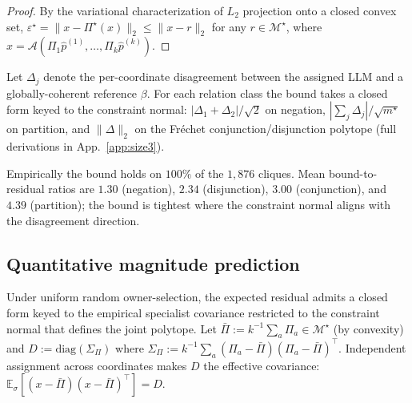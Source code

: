 \documentclass{article}
\theoremstyle{plain}
\theoremstyle{definition}
\theoremstyle{remark}
\newcommand{\Mjoint}{\mathcal{M}^{\star}}
\newcommand{\Pijoint}{\Pi^{\star}}
\newcommand{\Aagg}{\mathcal{A}}
\newcommand{\hpK}{\hat p}
\newcommand{\E}{\mathbb{E}}
\newcommand{\eps}{\varepsilon}
\begin{document}
\begin{proof}
By the variational characterization of $L_2$ projection onto a
closed convex set, $\eps^\star = \|x-\Pijoint(x)\|_2 \le \|x-r\|_2$
for any $r \in \Mjoint$, where
$x = \Aagg(\Pi_1\hpK^{(1)},\dots,\Pi_k\hpK^{(k)})$.
\end{proof}

Let $\Delta_j$ denote the per-coordinate disagreement between the
assigned LLM and a globally-coherent reference $\beta$. For each
relation class the bound takes a closed form keyed to the
constraint normal: $|\Delta_1{+}\Delta_2|/\sqrt{2}$ on negation,
$|\sum_j\Delta_j|/\sqrt{m^\star}$ on partition, and $\|\Delta\|_2$
on the Fr\'echet conjunction/disjunction polytope (full
derivations in App.~\ref{app:size3}).

Empirically the bound holds on $100\%$ of the $1{,}876$ cliques.
Mean bound-to-residual ratios are $1.30$ (negation), $2.34$
(disjunction), $3.00$ (conjunction), and $4.39$ (partition); the
bound is tightest where the constraint normal aligns with the
disagreement direction.

\subsection{Quantitative magnitude prediction}
\label{subsec:magnitude}

Under uniform random owner-selection, the expected residual admits a
closed form keyed to the empirical specialist covariance restricted to
the constraint normal that defines the joint polytope. Let
$\bar\Pi := k^{-1}\sum_a \Pi_a \in \Mjoint$ (by convexity) and
$D := \mathrm{diag}(\Sigma_\Pi)$ where
$\Sigma_\Pi := k^{-1}\sum_a (\Pi_a - \bar\Pi)(\Pi_a - \bar\Pi)^\top$.
Independent assignment across coordinates makes $D$ the effective
covariance: $\E_\sigma[(x-\bar\Pi)(x-\bar\Pi)^\top] = D$.
\end{document}
